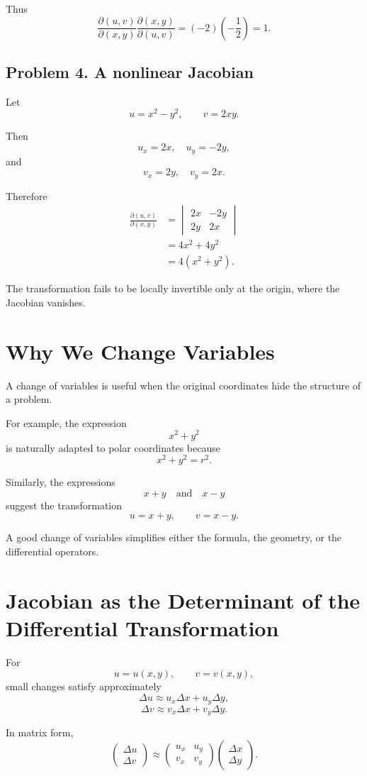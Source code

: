 \documentclass[11pt,oneside]{book}
\theoremstyle{studentthm}
\theoremstyle{definition}
\begin{document}
Thus
\[
\frac{\partial(u,v)}{\partial(x,y)}
\frac{\partial(x,y)}{\partial(u,v)}
=
(-2)\left(-\frac12\right)
=1.
\]

\subsection*{Problem 4. A nonlinear Jacobian}

Let
\[
u=x^2-y^2,
\qquad
v=2xy.
\]

Then
\[
u_x=2x,\quad u_y=-2y,
\]
and
\[
v_x=2y,\quad v_y=2x.
\]

Therefore
\[
\begin{aligned}
\frac{\partial(u,v)}{\partial(x,y)}
&=
\begin{vmatrix}
2x&-2y\\
2y&2x
\end{vmatrix}\\
&=
4x^2+4y^2\\
&=
4(x^2+y^2).
\end{aligned}
\]

The transformation fails to be locally invertible only at the origin,
where the Jacobian vanishes.



\section{Why We Change Variables}

A change of variables is useful when the original coordinates hide the
structure of a problem.

For example, the expression
\[
x^2+y^2
\]
is naturally adapted to polar coordinates because
\[
x^2+y^2=r^2.
\]

Similarly, the expressions
\[
x+y
\quad\text{and}\quad
x-y
\]
suggest the transformation
\[
u=x+y,\qquad v=x-y.
\]

A good change of variables simplifies either the formula, the geometry,
or the differential operators.

\section{Jacobian as the Determinant of the Differential Transformation}

For
\[
u=u(x,y),
\qquad
v=v(x,y),
\]
small changes satisfy approximately
\[
\Delta u
\approx
u_x\Delta x+u_y\Delta y,
\]
\[
\Delta v
\approx
v_x\Delta x+v_y\Delta y.
\]

In matrix form,
\[
\begin{pmatrix}
\Delta u\\
\Delta v
\end{pmatrix}
\approx
\begin{pmatrix}
u_x&u_y\\
v_x&v_y
\end{pmatrix}
\begin{pmatrix}
\Delta x\\
\Delta y
\end{pmatrix}.
\]
\end{document}
